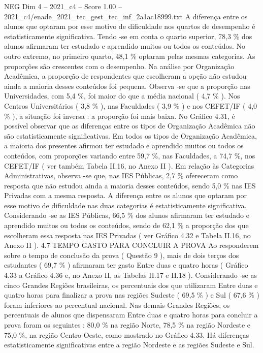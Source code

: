 \begin{textsample}{NEG Dim 4 – 2021\_c4 – Score 1.00 – 2021\_c4/enade\_2021\_tec\_gest\_tec\_inf\_2a1ac18999.txt}
A diferença entre os alunos que optaram por esse motivo de dificuldade nos quartos de desempenho é estatisticamente significativa.
Tendo -se em conta o quarto superior, 78,3 \% dos alunos afirmaram ter estudado e aprendido muitos ou todos os conteúdos.
No outro extremo, no primeiro quarto, 48,1 \% optaram pelas mesmas categorias.
As proporções são crescentes com o desempenho.
Na análise por Organização Acadêmica, a proporção de respondentes que escolheram a opção não estudou ainda a maioria desses conteúdos foi pequena.
Observa -se que a proporção nas Universidades, com 5,4 \%, foi maior do que a média nacional ( 4,7 \% ).
Nos Centros Universitários ( 3,8 \% ), nas Faculdades ( 3,9 \% ) e nos CEFET/IF ( 4,0 \% ), a situação foi inversa : a proporção foi mais baixa.
No Gráfico 4.31, é possível observar que as diferenças entre os tipos de Organização Acadêmica não são estatisticamente significativas.
Em todos os tipos de Organização Acadêmica, a maioria dos presentes afirmou ter estudado e aprendido muitos ou todos os conteúdos, com proporções variando entre 59,7 \%, nas Faculdades, a 74,7 \%, nos CEFET/IF ( ver também Tabela II.16, no Anexo II ).
Em relação às Categorias Administrativas, observa -se que, nas IES Públicas, 2,7 \% ofereceram como resposta que não estudou ainda a maioria desses conteúdos, sendo 5,0 \% nas IES Privadas com a mesma resposta.
A diferença entre os alunos que optaram por esse motivo de dificuldade nas duas categorias é estatisticamente significativa.
Considerando -se as IES Públicas, 66,5 \% dos alunos afirmaram ter estudado e aprendido muitos ou todos os conteúdos, sendo de 62,1 \% a proporção dos que escolheram essa resposta nas IES Privadas ( ver Gráfico 4.32 e Tabela II.16, no Anexo II ). 4.7 TEMPO GASTO PARA CONCLUIR A PROVA Ao responderem sobre o tempo de conclusão da prova ( Questão 9 ), mais de dois terços dos estudantes ( 69,7 \% ) afirmaram ter gasto Entre duas e quatro horas ( Gráfico 4.33 a Gráfico 4.36 e, no Anexo II, as Tabelas II.17 e II.18 ).
Considerando -se as cinco Grandes Regiões brasileiras, os percentuais dos que utilizaram Entre duas e quatro horas para finalizar a prova nas regiões Sudeste ( 69,5 \% ) e Sul ( 67,6 \% ) foram inferiores ao percentual nacional.
Nas demais Grandes Regiões, os percentuais de alunos que dispensaram Entre duas e quatro horas para concluir a prova foram os seguintes : 80,0 \% na região Norte, 78,5 \% na região Nordeste e 75,0 \%, na região Centro-Oeste, como mostrado no Gráfico 4.33.
Há diferenças estatisticamente significativas entre a região Nordeste e as regiões Sudeste e Sul.

\end{textsample}
